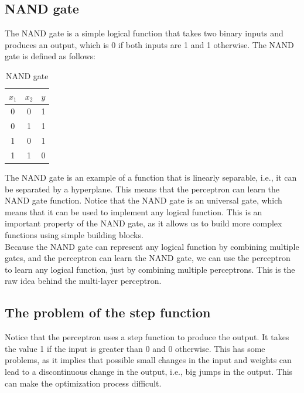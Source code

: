 \subsection{NAND gate}

The NAND gate is a simple logical function that takes two binary inputs and
produces an output, which is 0 if both inputs are 1 and 1 otherwise. The NAND
gate is defined as follows:

\begin{table}[H]
    \centering
    \begin{tabular}{|c|c|c|}
        \hline
        $x_1$ & $x_2$ & $y$\\
        \hline
        0 & 0 & 1\\
        0 & 1 & 1\\
        1 & 0 & 1\\
        1 & 1 & 0\\
        \hline
    \end{tabular}
    \caption{NAND gate}
\end{table}

The NAND gate is an example of a function that is linearly separable, i.e., it can
be separated by a hyperplane. This means that the perceptron can learn the NAND
gate function. Notice that the NAND gate is an universal gate, which means that
it can be used to implement any logical function. This is an important property
of the NAND gate, as it allows us to build more complex functions using simple
building blocks.\\

Because the NAND gate can represent any logical function by combining multiple
gates, and the perceptron can learn the NAND gate, we can use the perceptron to
learn any logical function, just by combining multiple perceptrons. This is the
raw idea behind the multi-layer perceptron.

\subsection{The problem of the step function}

Notice that the perceptron uses a step function to produce the output. It takes 
the value 1 if the input is greater than 0 and 0 otherwise. This has some problems,
as it implies that possible small changes in the input and weights can lead to a
discontinuous change in the output, i.e., big jumps in the output. This can make
the optimization process difficult.\\

